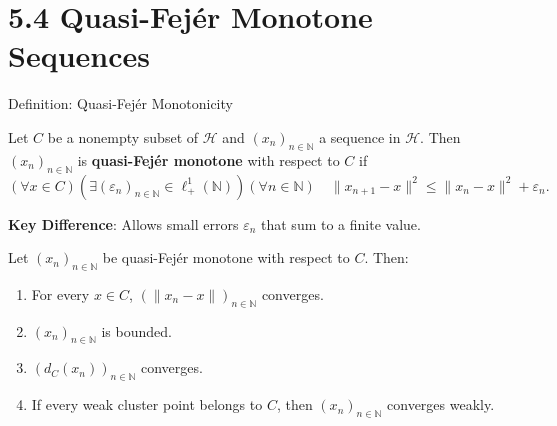 \documentclass[aspectratio=169,10pt]{beamer}
\begin{document}
\section{5.4 Quasi-Fejér Monotone Sequences}

\begin{frame}{Definition: Quasi-Fejér Monotonicity}
    \begin{definition}[Definition 5.32]
        Let $C$ be a nonempty subset of $\mathcal{H}$ and $(x_n)_{n \in \mathbb{N}}$ a sequence in $\mathcal{H}$.
        Then $(x_n)_{n \in \mathbb{N}}$ is \textbf{quasi-Fejér monotone} with respect to $C$ if
        \[
            (\forall x \in C)(\exists (\varepsilon_n)_{n \in \mathbb{N}} \in \ell_+^1(\mathbb{N}))(\forall n \in \mathbb{N}) \quad \|x_{n+1} - x\|^2 \leq \|x_n - x\|^2 + \varepsilon_n.
        \]
    \end{definition}

    \vspace{0.3cm}

    \textbf{Key Difference}: Allows small errors $\varepsilon_n$ that sum to a finite value.

    \vspace{0.3cm}

    \begin{theorem}[Theorem 5.33]
        Let $(x_n)_{n \in \mathbb{N}}$ be quasi-Fejér monotone with respect to $C$.
        Then:
        \begin{enumerate}
            \item For every $x \in C$, $(\|x_n - x\|)_{n \in \mathbb{N}}$ converges.
            \item $(x_n)_{n \in \mathbb{N}}$ is bounded.
            \item $(d_C(x_n))_{n \in \mathbb{N}}$ converges.
            \item If every weak cluster point belongs to $C$, then $(x_n)_{n \in \mathbb{N}}$ converges weakly.
        \end{enumerate}
    \end{theorem}
\end{frame}
\end{document}
